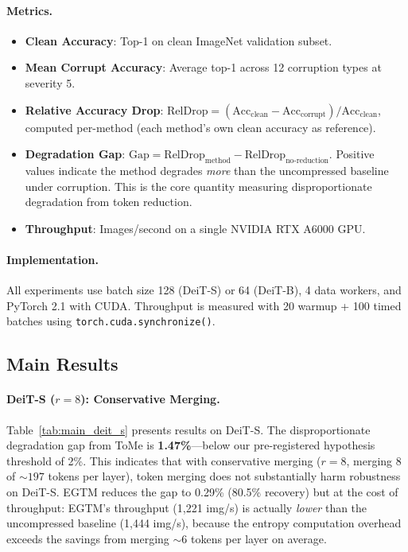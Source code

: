 \documentclass{article}
\newcommand{\ours}{EGTM}
\begin{document}
\paragraph{Metrics.}
\begin{itemize}
    \item \textbf{Clean Accuracy}: Top-1 on clean ImageNet validation subset.
    \item \textbf{Mean Corrupt Accuracy}: Average top-1 across 12 corruption types at severity 5.
    \item \textbf{Relative Accuracy Drop}: $\text{RelDrop} = (\text{Acc}_{\text{clean}} - \text{Acc}_{\text{corrupt}}) / \text{Acc}_{\text{clean}}$, computed per-method (each method's own clean accuracy as reference).
    \item \textbf{Degradation Gap}: $\text{Gap} = \text{RelDrop}_{\text{method}} - \text{RelDrop}_{\text{no-reduction}}$. Positive values indicate the method degrades \emph{more} than the uncompressed baseline under corruption. This is the core quantity measuring disproportionate degradation from token reduction.
    \item \textbf{Throughput}: Images/second on a single NVIDIA RTX A6000 GPU.
\end{itemize}

\paragraph{Implementation.}
All experiments use batch size 128 (DeiT-S) or 64 (DeiT-B), 4 data workers, and PyTorch 2.1 with CUDA. Throughput is measured with 20 warmup + 100 timed batches using \texttt{torch.cuda.synchronize()}.

\subsection{Main Results}

\paragraph{DeiT-S ($r{=}8$): Conservative Merging.}
Table~\ref{tab:main_deit_s} presents results on DeiT-S. The disproportionate degradation gap from ToMe is \textbf{1.47\%}---below our pre-registered hypothesis threshold of 2\%. This indicates that with conservative merging ($r{=}8$, merging 8 of ${\sim}197$ tokens per layer), token merging does not substantially harm robustness on DeiT-S. \ours{} reduces the gap to 0.29\% (80.5\% recovery) but at the cost of throughput: \ours{}'s throughput (1,221 img/s) is actually \emph{lower} than the uncompressed baseline (1,444 img/s), because the entropy computation overhead exceeds the savings from merging ${\sim}6$ tokens per layer on average.
\end{document}
